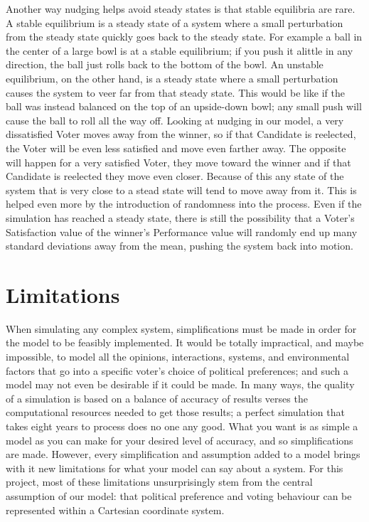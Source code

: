 \documentclass[12pt]{article}
\begin{document}
\qquad Another way nudging helps avoid steady states is that stable equilibria are rare. A stable equilibrium is a steady state of a system where a small perturbation from the steady state quickly goes back to the steady state. For example a ball in the center of a large bowl is at a stable equilibrium; if you push it alittle in any direction, the ball just rolls back to the bottom of the bowl. An unstable equilibrium, on the other hand, is a steady state where a small perturbation causes the system to veer far from that steady state. This would be like if the ball was instead balanced on the top of an upside-down bowl; any small push will cause the ball to roll all the way off. Looking at nudging in our model, a very dissatisfied Voter moves away from the winner, so if that Candidate is reelected, the Voter will be even less satisfied and move even farther away. The opposite will happen for a very satisfied Voter, they move toward the winner and if that Candidate is reelected they move even closer. Because of this any state of the system that is very close to a stead state will tend to move away from it. This is helped even more by the introduction of randomness into the process. Even if the simulation has reached a steady state, there is still the possibility that a Voter's Satisfaction value of the winner's Performance value will randomly end up many standard deviations away from the mean, pushing the system back into motion. \\

\section{Limitations} \label{Limitations}
\qquad When simulating any complex system, simplifications must be made in order for the model to be feasibly implemented. It would be totally impractical, and maybe impossible, to model all the opinions, interactions, systems, and environmental factors that go into a specific voter's choice of political preferences; and such a model may not even be desirable if it could be made. In many ways, the quality of a simulation is based on a balance of accuracy of results verses the computational resources needed to get those results; a perfect simulation that takes eight years to process does no one any good. What you want is as simple a model as you can make for your desired level of accuracy, and so simplifications are made. However, every simplification and assumption added to a model brings with it new limitations for what your model can say about a system. For this project, most of these limitations unsurprisingly stem from the central assumption of our model: that political preference and voting behaviour can be represented within a Cartesian coordinate system. \\
\end{document}
